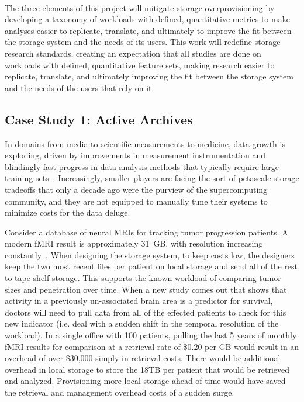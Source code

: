 \\
 The three elements of this project will mitigate storage overprovisioning by developing a
taxonomy of workloads with defined, quantitative metrics to make analyses
easier to replicate, translate, and ultimately to improve the fit between the
storage system and the needs of its users. %
This work will redefine storage research standards, creating an expectation that all studies
are done on workloads with defined, quantitative feature sets, making research
easier to replicate, translate, and ultimately improving the fit between the
storage system and the needs of the users that rely on it.%

\subsection{Case Study 1: Active Archives}
In domains from media to scientific measurements to medicine, data growth is exploding, driven by
improvements in measurement instrumentation and blindingly fast progress in data
analysis methods that typically require large training sets~\cite{raghupathi2014big,gantz2012digital,chen2014big}.
Increasingly, smaller players are facing the sort of petascale storage tradeoffs
that only a decade ago were the purview of the supercomputing community, and
they are not equipped to manually tune their systems to minimize costs for the
data deluge.  

Consider a
database of neural MRIs for tracking tumor progression patients.  A modern fMRI
result is approximately 31~GB, with resolution increasing
constantly~\cite{hanke2014high}. When designing the storage system,
to keep costs low, the designers keep the two most recent files per patient on local
storage and send all of the rest to tape shelf-storage.  This supports the known
workload of comparing tumor sizes and penetration over time.  When a new study
comes out that shows that activity in a previously un-associated brain area is a
predictor for survival, doctors will need to pull data from all of the effected
patients to check for this new indicator (i.e. deal with a sudden shift in the
temporal resolution of the workload).  In a single office with 100 patients,
pulling the last 5 years of monthly fMRI results for comparison at a retrieval
rate of \$0.20 per GB would result in an overhead of over \$30,000 simply in
retrieval costs.  There would be additional overhead in local storage to store
the 18TB per patient that would be retrieved and analyzed.  Provisioning more
local storage ahead of time would have saved the retrieval and management
overhead costs of a sudden surge.    

